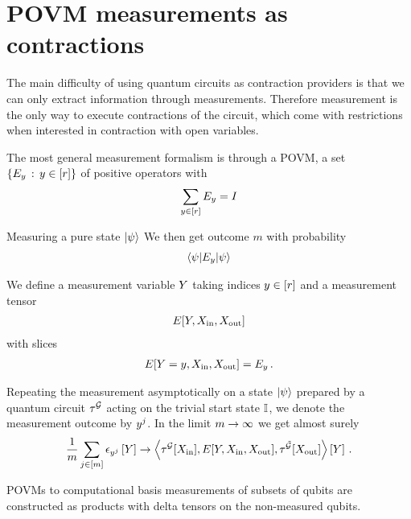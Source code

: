 \documentclass[aps,onecolumn,nofootinbib,pra]{article}
\begin{document}


    \section{POVM measurements as contractions}

    The main difficulty of using quantum circuits as contraction providers is that we can only extract information through measurements.
    Therefore measurement is the only way to execute contractions of the circuit, which come with restrictions when interested in contraction with open variables.

    The most general measurement formalism is through a POVM, a set $\{E_y \, : \, y\in[r]\}$ of positive operators with %
    \begin{align*}
        \sum_{y\in[r]} E_y = I
    \end{align*}

    Measuring a pure state $\ket{\psi}$ We then get outcome $m$ with probability
    \begin{align*}
        \braket{\psi|E_y|\psi}
    \end{align*}

    We define a measurement variable $Y$ taking indices $y\in[r]$ and a measurement tensor
    \begin{align*}
        E[Y,X_{\mathrm{in}},X_{\mathrm{out}}]
    \end{align*}
    with slices
    \begin{align*}
        E[Y=y,X_{\mathrm{in}},X_{\mathrm{out}}] = E_y \, .
    \end{align*}

    Repeating the measurement asymptotically on a state $\ket{\psi}$ prepared by a quantum circuit $\tau^{\mathcal{G}}$ acting on the trivial start state $\mathbb{I}$, we denote the measurement outcome by $y^j$.
    In the limit $m\rightarrow\infty$ we get almost surely
    \begin{align*}
        \frac{1}{m} \sum_{j\in[m]} \epsilon_{y^j}\left[Y\right] \rightarrow
        \left\langle \tau^{\mathcal{G}}[X_{\mathrm{in}}],E[Y,X_{\mathrm{in}},X_{\mathrm{out}}],\tau^{\tilde{\mathcal{G}}}[X_{\mathrm{out}}]\right\rangle \left[ Y \right] \, .
    \end{align*}

    POVMs to computational basis measurements of subsets of qubits are constructed as products with delta tensors on the non-measured qubits.
\end{document}
